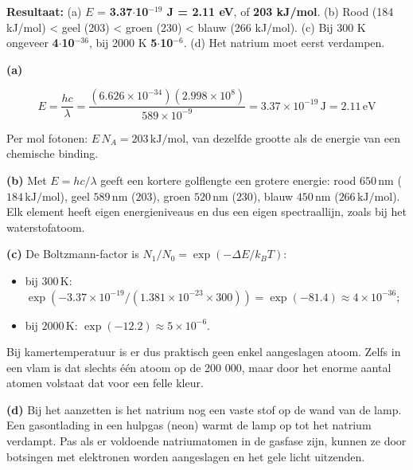 \begin{oplossing}
\textbf{Resultaat:} (a) \(E\) = \textbf{3.37\ensuremath{\cdot{}}10\ensuremath{^{-19}} J = 2.11 eV}, of \textbf{203 kJ/mol}. (b) Rood (184 kJ/mol) \textless{} geel (203) \textless{} groen (230) \textless{} blauw (266 kJ/mol). (c) Bij 300 K ongeveer \textbf{4\ensuremath{\cdot{}}10\ensuremath{^{-36}}}, bij 2000 K \textbf{5\ensuremath{\cdot{}}10\ensuremath{^{-6}}}. (d) Het natrium moet eerst verdampen.

\textbf{(a)}

\[
E = \frac{hc}{\lambda} = \frac{(6.626\times10^{-34})(2.998\times10^{8})}{589\times10^{-9}} = 3.37\times10^{-19}\,\mathrm{J} = 2.11\,\mathrm{eV}
\]

Per mol fotonen: \(E\,N_A = 203\,\mathrm{kJ/mol}\), van dezelfde grootte als de energie van een chemische binding.

\textbf{(b)} Met \(E = hc/\lambda\) geeft een kortere golflengte een grotere energie: rood \(650\,\mathrm{nm}\) (\(184\,\mathrm{kJ/mol}\)), geel \(589\,\mathrm{nm}\) (\(203\)), groen \(520\,\mathrm{nm}\) (\(230\)), blauw \(450\,\mathrm{nm}\) (\(266\,\mathrm{kJ/mol}\)). Elk element heeft eigen energieniveaus en dus een eigen spectraallijn, zoals bij het waterstofatoom.

\textbf{(c)} De Boltzmann-factor is \(N_1/N_0 = \exp(-\Delta E/k_BT)\):

\begin{itemize}
\item
  bij \(300\,\mathrm{K}\): \(\exp(-3.37\times10^{-19}/(1.381\times10^{-23}\times300)) = \exp(-81.4) \approx 4\times10^{-36}\);
\item
  bij \(2000\,\mathrm{K}\): \(\exp(-12.2) \approx 5\times10^{-6}\).
\end{itemize}

Bij kamertemperatuur is er dus praktisch geen enkel aangeslagen atoom. Zelfs in een vlam is dat slechts één atoom op de 200 000, maar door het enorme aantal atomen volstaat dat voor een felle kleur.

\textbf{(d)} Bij het aanzetten is het natrium nog een vaste stof op de wand van de lamp. Een gasontlading in een hulpgas (neon) warmt de lamp op tot het natrium verdampt. Pas als er voldoende natriumatomen in de gasfase zijn, kunnen ze door botsingen met elektronen worden aangeslagen en het gele licht uitzenden.
\end{oplossing}

